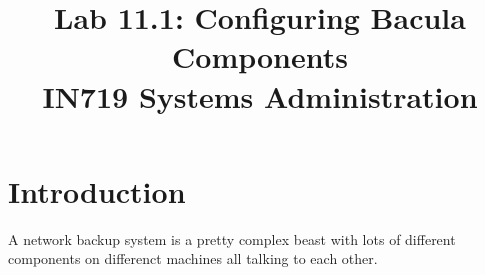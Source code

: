 \documentclass{article}   	%
\title{Lab 11.1:  Configuring Bacula Components \\ IN719 Systems Administration}
\date{}							%
\begin{document}
\maketitle

\section*{Introduction}
A network backup system is a pretty complex beast with lots of different components on differenct machines all talking to each other. 
\end{document}
